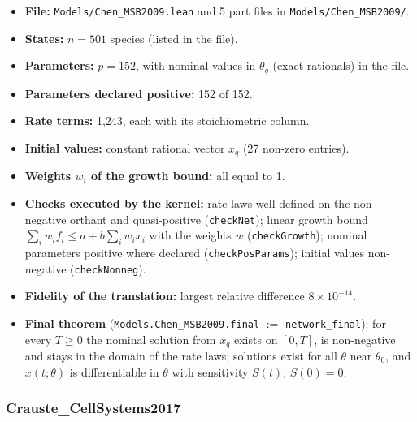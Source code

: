 \begin{itemize}\itemsep0pt\small
\item \textbf{File:} \texttt{Models/Chen\_MSB2009.lean} and 5 part files in \texttt{Models/Chen\_MSB2009/}.
\item \textbf{States:} $n=501$ species (listed in the file).
\item \textbf{Parameters:} $p=152$, with nominal values in \texttt{$\theta_q$} (exact rationals) in the file.
\item \textbf{Parameters declared positive:} 152 of 152.
\item \textbf{Rate terms:} 1{,}243, each with its stoichiometric column.
\item \textbf{Initial values:} constant rational vector $x_q$ (27 non-zero entries).
\item \textbf{Weights $w_i$ of the growth bound:} all equal to 1.
\item \textbf{Checks executed by the kernel:} rate laws well defined on the non-negative orthant and quasi-positive (\texttt{checkNet}); linear growth bound $\sum_iw_if_i\le a+b\sum_iw_ix_i$ with the weights $w$ (\texttt{checkGrowth}); nominal parameters positive where declared (\texttt{checkPosParams}); initial values non-negative (\texttt{checkNonneg}).
\item \textbf{Fidelity of the translation:} largest relative difference $8\times10^{-14}$.
\item \textbf{Final theorem} (\texttt{Models.Chen\_MSB2009.final} $:=$ \texttt{network\_final}): for every $T\ge0$ the nominal solution from $x_q$ exists on $[0,T]$, is non-negative and stays in the domain of the rate laws; solutions exist for all $\theta$ near $\theta_0$, and $x(t;\theta)$ is differentiable in $\theta$ with sensitivity $S(t)$, $S(0)=0$.
\end{itemize}

\subsubsection*{Crauste\_CellSystems2017}

